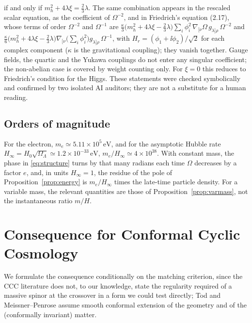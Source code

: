 \begin{remark}
if and only if $m_{h}^{2}+4\lambda\xi=\tfrac23\lambda$. The same combination appears in the rescaled scalar equation, as the coefficient of $\Omega^{-2}$, and in Friedrich's equation (2.17), whose terms of order $\Omega^{-2}$ and $\Omega^{-1}$ are $\tfrac{\kappa}{3}\bigl(m_{h}^{2}+4\lambda\xi-\tfrac23\lambda\bigr)\sum_{i}\phi_{i}^{2}\,\nabla_{[\nu}\Omega\,g_{\lambda]\rho}\,\Omega^{-2}$ and $\tfrac{\kappa}{6}\bigl(m_{h}^{2}+4\lambda\xi-\tfrac23\lambda\bigr)\nabla_{[\nu}\bigl(\sum_{i}\phi_{i}^{2}\bigr)g_{\lambda]\rho}\,\Omega^{-1}$, with $H_{r}=(\phi_{1}+\ii\phi_{2})/\sqrt2$ for each complex component ($\kappa$ is the gravitational coupling); they vanish together. Gauge fields, the quartic and the Yukawa couplings do not enter any singular coefficient; the non-abelian case is covered by weight counting only. For $\xi=0$ this reduces to Friedrich's condition for the Higgs. These statements were checked symbolically and confirmed by two isolated AI auditors; they are not a substitute for a human reading.
\end{remark}

\subsection{Orders of magnitude}

For the electron, $m_{e}\simeq5.11\times10^{5}\,\mathrm{eV}$, and for the asymptotic Hubble rate $H_{\infty}=H_{0}\sqrt{\Omega_{\Lambda}}\simeq1.2\times10^{-33}\,\mathrm{eV}$, $m_{e}/H_{\infty}\simeq4\times10^{38}$. With constant mass, the phase in \eqref{eq:structure} turns by that many radians each time $\Omega$ decreases by a factor $e$, and, in units $H_{\infty}=1$, the residue of the pole of Proposition~\ref{prop:energy} is $m_{e}/H_{\infty}$ times the late-time particle density. For a variable mass, the relevant quantities are those of Proposition~\ref{prop:varmass}, not the instantaneous ratio $m/H$.

\section{Consequence for Conformal Cyclic Cosmology}
\label{sec:ccc}

We formulate the consequence conditionally on the matching criterion, since the CCC literature does not, to our knowledge, state the regularity required of a massive spinor at the crossover in a form we could test directly; Tod \cite{Tod2013} and Meissner--Penrose \cite{MeissnerPenrose2025} assume smooth conformal extension of the geometry and of the (conformally invariant) matter.

